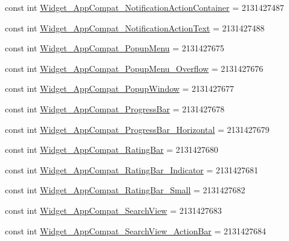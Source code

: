 \begin{DoxyCompactItemize}
\item 
const int \mbox{\hyperlink{class_f_w_p_s___app_1_1_droid_1_1_resource_1_1_style_a4f96721f98a0a010c4a69e6613ac95bf}{Widget\+\_\+\+App\+Compat\+\_\+\+Notification\+Action\+Container}} = 2131427487
\item 
const int \mbox{\hyperlink{class_f_w_p_s___app_1_1_droid_1_1_resource_1_1_style_a72b4eee10b2e684542ee638dca5e6e2b}{Widget\+\_\+\+App\+Compat\+\_\+\+Notification\+Action\+Text}} = 2131427488
\item 
const int \mbox{\hyperlink{class_f_w_p_s___app_1_1_droid_1_1_resource_1_1_style_ad6d79522351f023d508a50278c9e5700}{Widget\+\_\+\+App\+Compat\+\_\+\+Popup\+Menu}} = 2131427675
\item 
const int \mbox{\hyperlink{class_f_w_p_s___app_1_1_droid_1_1_resource_1_1_style_a551ad1e1aeaec96b91f5d1294288d9a5}{Widget\+\_\+\+App\+Compat\+\_\+\+Popup\+Menu\+\_\+\+Overflow}} = 2131427676
\item 
const int \mbox{\hyperlink{class_f_w_p_s___app_1_1_droid_1_1_resource_1_1_style_a2131c675cc49c517dc27b17f5e24bc17}{Widget\+\_\+\+App\+Compat\+\_\+\+Popup\+Window}} = 2131427677
\item 
const int \mbox{\hyperlink{class_f_w_p_s___app_1_1_droid_1_1_resource_1_1_style_ac24c72034cab258d53186a67c8e10de1}{Widget\+\_\+\+App\+Compat\+\_\+\+Progress\+Bar}} = 2131427678
\item 
const int \mbox{\hyperlink{class_f_w_p_s___app_1_1_droid_1_1_resource_1_1_style_a9b9e2a492ff8d4ec517ee94215427a99}{Widget\+\_\+\+App\+Compat\+\_\+\+Progress\+Bar\+\_\+\+Horizontal}} = 2131427679
\item 
const int \mbox{\hyperlink{class_f_w_p_s___app_1_1_droid_1_1_resource_1_1_style_adddb4d21326ccfa73b95ffabff54adfb}{Widget\+\_\+\+App\+Compat\+\_\+\+Rating\+Bar}} = 2131427680
\item 
const int \mbox{\hyperlink{class_f_w_p_s___app_1_1_droid_1_1_resource_1_1_style_a47143c9a44d8b1772359b8581d2c79fb}{Widget\+\_\+\+App\+Compat\+\_\+\+Rating\+Bar\+\_\+\+Indicator}} = 2131427681
\item 
const int \mbox{\hyperlink{class_f_w_p_s___app_1_1_droid_1_1_resource_1_1_style_ab2f0e41843d3923a66c9362b33517234}{Widget\+\_\+\+App\+Compat\+\_\+\+Rating\+Bar\+\_\+\+Small}} = 2131427682
\item 
const int \mbox{\hyperlink{class_f_w_p_s___app_1_1_droid_1_1_resource_1_1_style_a7202a98791c339e2b8a847995394c4fe}{Widget\+\_\+\+App\+Compat\+\_\+\+Search\+View}} = 2131427683
\item 
const int \mbox{\hyperlink{class_f_w_p_s___app_1_1_droid_1_1_resource_1_1_style_a0545f89da349d9de0ad6228a5d5a6d39}{Widget\+\_\+\+App\+Compat\+\_\+\+Search\+View\+\_\+\+Action\+Bar}} = 2131427684

\end{DoxyCompactItemize}
